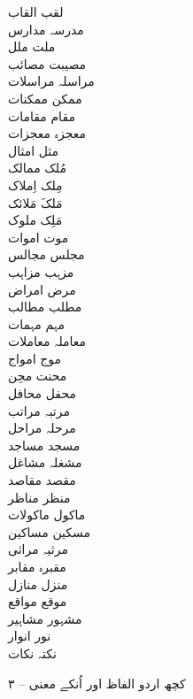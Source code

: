 \documentclass[a4paper]{article}
\begin{document}
\begin{multicols}{3}
\begin{tabbing}
لقب \> القاب\\
مدرسہ \> مدارس\\
ملت \> ملل\\
مصیبت \> مصائب\\
مراسلہ \> مراسلات\\
ممکن \> ممکنات\\
مقام \> مقامات\\
معجزہ \> معجزات\\
مثل \> امثال\\
مُلک \> ممالک\\
مِلک \> اِملاک\\
مَلکَ \> مَلائک\\
مَلِک \> ملوک\\
موت \> اموات\\
مجلس \> مجالس\\
مزہب \> مزاہب\\
مرض \> امراض\\
مطلب \> مطالب\\
مہم \> مہمات\\
معاملہ \> معاملات\\
موج \> امواج\\
محنت \> محِن\\
محفل \> محافل\\
مرتبہ \> مراتب\\
مرحلہ \> مراحل\\
مسجد \> مساجد\\
مشغلہ \> مشاغل\\
مقصد \> مقاصد\\
منظر \> مناظر\\
ماکول \> ماکولات\\
مسکین \> مساکین\\
مرثیہ \> مراثی\\
مقبرہ \> مقابر\\
منزل \> منازل\\
موقع \> مواقع\\
مشہور \> مشاہیر\\
نور \> انوار\\
نکتہ \> نکات\\
\end{tabbing}
\end{multicols}
\clearpage
\begin{center}
{\fontsize{36pt}{18pt}\titlefont ۳ – کچھ اردو الفاظ اور اُنکے معنی}
\end{center}
\fontsize{12pt}{12pt}\linespread{1.2}\itfhindi
\newcommand{\seturdulabel}[1]{\item[\RLE{\notourdu #1}]\hfill\\}
\setLTR
\RTLmulticolcolumns
\begin{multicols}{3}
\begin{description}[listparindent=0pt,leftmargin=0pt]
%
{%
\seturdulabel{\word}
\meaning
}%
\end{description}
\end{multicols}
\end{document}
